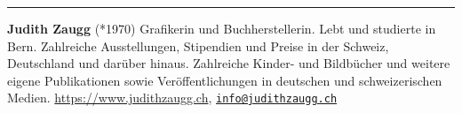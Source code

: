 \begin{center}\rule{0.5\linewidth}{0.5pt}\end{center}

\textbf{Judith Zaugg} (*1970) Grafikerin und Buchherstellerin. Lebt und
studierte in Bern. Zahlreiche Ausstellungen, Stipendien und Preise in
der Schweiz, Deutschland und darüber hinaus. Zahlreiche Kinder- und
Bildbücher und weitere eigene Publikationen sowie Veröffentlichungen in
deutschen und schweizerischen Medien. \url{https://www.judithzaugg.ch},
\href{mailto:info@judithzaugg.ch}{\nolinkurl{info@judithzaugg.ch}}
